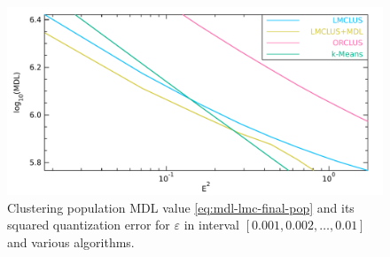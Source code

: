 \begin{figure}[ht]
\centering
\includegraphics[scale=\IfClass{IEEEtran}{0.3}{0.5}]{img/toterrs2-mdl-si.pdf}
\caption{Clustering population MDL value \eqref{eq:mdl-lmc-final-pop} and its squared quantization error for $\varepsilon$ in interval $\left[0.001, 0.002, \dots, 0.01 \right]$ and various algorithms.}
\label{fig:mdl-error-pop}
\end{figure}


